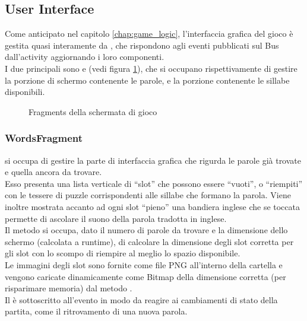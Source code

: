 


\subsection{User Interface}
\label{chap:ui}

Come anticipato nel capitolo \ref{chap:game_logic}, l'interfaccia grafica del gioco è gestita quasi interamente da , che rispondono agli eventi pubblicati sul Bus dall'activity  aggiornando i loro componenti.\\
I due principali  sono  e  (vedi figura \ref{fig:fragments}), che si occupano rispettivamente di gestire la porzione di schermo contenente le parole, e la porzione contenente le sillabe disponibili.

\begin{figure}[h!]
\label{fig:fragments}
  \centering
  \caption{Fragments della schermata di gioco}
\end{figure}


\subsubsection{WordsFragment}
\label{sec:words_fragment}
 si occupa di gestire la parte di interfaccia grafica che rigurda le parole già trovate e quella ancora da trovare.\\
Esso presenta una lista verticale di ``slot'' che possono essere ``vuoti'', o ``riempiti'' con le tessere di puzzle corrispondenti alle sillabe che formano la parola. Viene inoltre mostrata accanto ad ogni slot ``pieno'' una bandiera inglese che se toccata permette di ascolare il suono della parola tradotta in inglese.\\
Il metodo  si occupa, dato il numero di parole da trovare e la dimensione dello schermo (calcolata a runtime), di calcolare la dimensione degli slot corretta per gli slot con lo scompo di riempire al meglio lo spazio disponibile.\\
Le immagini degli slot sono fornite come file PNG all'interno della cartella  e vengono caricate dinamicamente come Bitmap della dimensione corretta (per risparimare memoria) dal metodo .\\
Il  è sottoscritto all'evento  in modo da reagire ai cambiamenti di stato della partita, come il ritrovamento di una nuova parola.

